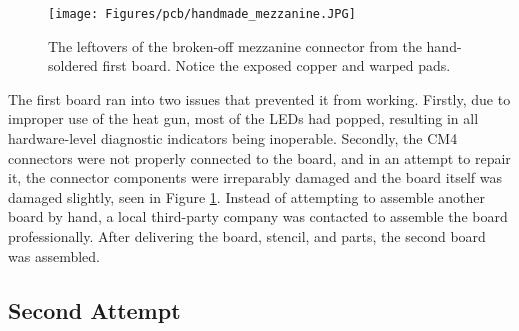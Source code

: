 \begin{figure}[t]
  \centering
  \texttt{[image: Figures/pcb/handmade\_mezzanine.JPG]}
  \caption[Hand-soldered mezzanine connector]{The leftovers of the broken-off mezzanine connector from the hand-soldered first board. Notice the exposed copper and warped pads.}
  \label{fig:brokenmezzanine}
\end{figure}

The first board ran into two issues that prevented it from working.
Firstly, due to improper use of the heat gun, most of the LEDs had popped, resulting in all hardware-level diagnostic indicators being inoperable.
Secondly, the CM4 connectors were not properly connected to the board, and in an attempt to repair it, the connector components were irreparably damaged and the board itself was damaged slightly, seen in Figure \ref{fig:brokenmezzanine}.
Instead of attempting to assemble another board by hand, a local third-party company was contacted to assemble the board professionally.
After delivering the board, stencil, and parts, the second board was assembled.

\subsection{Second Attempt}\label{subsec:Manufacturing2}

